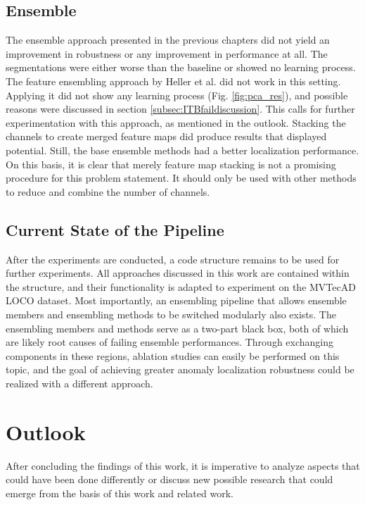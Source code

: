 \subsection{Ensemble}
The ensemble approach presented in the previous chapters did not yield an improvement in robustness or any improvement in performance at all. The segmentations were either 
worse than the baseline or showed no learning process. The feature ensembling approach by Heller et al. \cite{EnsembleHeller2023} did not work in this setting. Applying it did not show any learning 
process (Fig. \ref{fig:pca_res}), and possible reasons were discussed in section \ref{subsec:ITBfaildiscussion}. This calls for further experimentation with this approach, as mentioned 
in the outlook. Stacking the channels to create merged feature maps did produce results that displayed potential. Still, the base ensemble methods had a better localization 
performance. On this basis, it is clear that merely feature map stacking is not a promising procedure for this problem statement. It should only be used  
with other methods to reduce and combine the number of channels.

\subsection{Current State of the Pipeline}
After the experiments are conducted, a code structure remains to be used for further experiments. 
All approaches discussed in this work are contained within the structure, and their functionality is adapted to experiment on the MVTecAD LOCO \cite{LOCODentsAndScratchesBergmann2022} dataset. Most 
importantly, an ensembling pipeline that allows ensemble members and ensembling methods to be switched modularly also exists. The ensembling members and methods 
serve as a two-part black box, both of which are likely root causes of failing ensemble performances. 
Through exchanging components in these regions, ablation studies can easily be performed on this topic, and the goal of achieving greater anomaly localization robustness 
could be realized with a different approach.


\section{Outlook}
\label{sec:finaloutlook}

After concluding the findings of this work, it is imperative to analyze aspects that could have been done differently or discuss new possible research that could emerge from 
the basis of this work and related work.\newline

